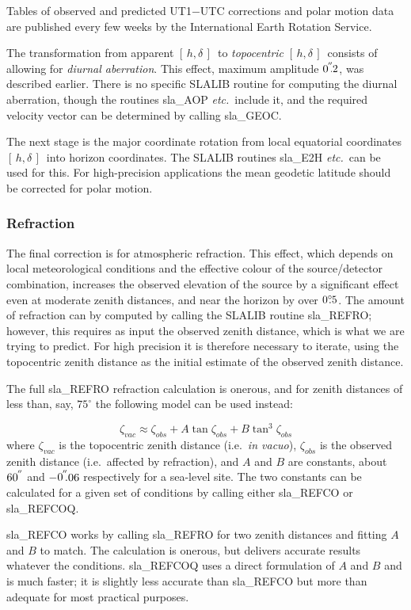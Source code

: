 \documentclass[11pt,twoside]{article}
\newcommand{\hadec}     {$[\,h,\delta\,]$}
\newcommand{\degree}[2] {$#1^{\circ}
                        \hspace{-0.37em}.\hspace{0.02em}#2$}
\newcommand{\arcsec}[2] {\arcseci{#1}$\hspace{-0.4em}.#2$}
\newcommand{\arcsec}[2] {
      {$#1\hspace{-0.05em}^{'\hspace{-0.1em}'}\hspace{-0.4em}.#2$}
   }
\newcommand{\arcseci}[1] {$#1\hspace{-0.05em}$\raisebox{-0.5ex}
                         {$^{'\hspace{-0.1em}'}$}}
\renewcommand{\arcseci}[1] {$#1\hspace{-0.05em}^{'\hspace{-0.1em}'}$}
\begin{document}
Tables of observed and
predicted UT1$-$UTC corrections and polar motion data
are published every few weeks by the International Earth Rotation Service.

The transformation from apparent \hadec\ to {\it topocentric}\/
\hadec\ consists of allowing for
{\it diurnal aberration}.  This effect, maximum amplitude \arcsec{0}{2},
was described earlier.  There is no specific SLALIB routine
for computing the diurnal aberration,
though the routines
sla\_AOP {\it etc.}\
include it, and the required velocity vector can be
determined by calling
sla\_GEOC.

The next stage is the major coordinate rotation from local equatorial
coordinates \hadec\ into horizon coordinates.  The SLALIB routines
sla\_E2H
{\it etc.}\ can be used for this.  For high-precision
applications the mean geodetic latitude should be corrected for polar
motion.

\subsubsection{Refraction}
The final correction is for atmospheric refraction.
This effect, which depends on local meteorological conditions and
the effective colour of the source/detector combination,
increases the observed elevation of the source by a
significant effect even at moderate zenith distances, and near the
horizon by over \degree{0}{5}.  The amount of refraction can by
computed by calling the SLALIB routine
sla\_REFRO;
however,
this requires as input the observed zenith distance, which is what
we are trying to predict.  For high precision it is
therefore necessary to iterate, using the topocentric
zenith distance as the initial estimate of the
observed zenith distance.

The full
sla\_REFRO refraction calculation is onerous, and for
zenith distances of less than, say, $75^{\circ}$ the following
model can be used instead:

\[ \zeta _{vac} \approx \zeta _{obs}
                     + A \tan \zeta _{obs}
                     + B \tan ^{3}\zeta _{obs} \]
where $\zeta _{vac}$ is the topocentric
zenith distance (i.e.\ {\it in vacuo}),
$\zeta _{obs}$ is the observed
zenith distance (i.e.\ affected by refraction), and $A$ and $B$ are
constants, about \arcseci{60}
and \arcsec{-0}{06} respectively for a sea-level site.
The two constants can be calculated for a given set of conditions
by calling either
sla\_REFCO or
sla\_REFCOQ.

sla\_REFCO works by calling
sla\_REFRO for two zenith distances and fitting $A$ and $B$
to match.  The calculation is onerous, but delivers accurate
results whatever the conditions.
sla\_REFCOQ uses a direct formulation of $A$ and $B$ and
is much faster;  it is slightly less accurate than
sla\_REFCO but more than adequate for most practical purposes.
\end{document}
